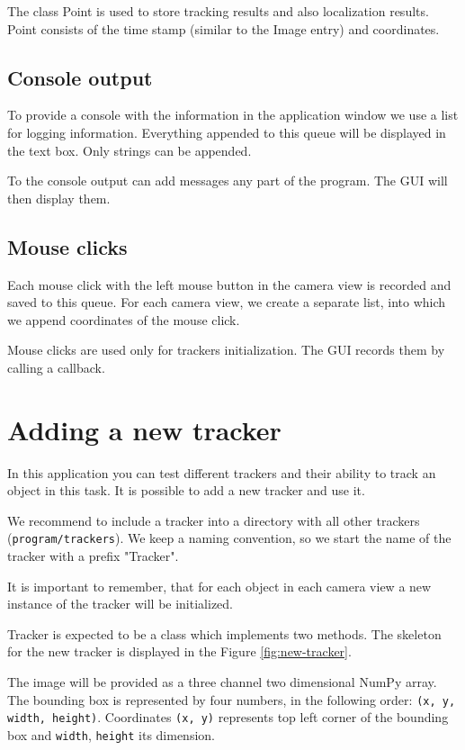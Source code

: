 The class Point is used to store tracking results and also localization
results. Point consists of the time stamp (similar to the Image entry) and
coordinates.

\subsection*{Console output}

To provide a console with the information in the application window we use a
list for logging information. Everything appended to this queue will be
displayed in the text box. Only strings can be appended.

To the console output can add messages any part of the program. The GUI will
then display them.

\subsection*{Mouse clicks}

Each mouse click with the left mouse button in the camera view is recorded and
saved to this queue. For each camera view, we create a separate list, into
which we append coordinates of the mouse click.

Mouse clicks are used only for trackers initialization. The GUI records them by
calling a callback.

\section{Adding a new tracker} 

In this application you can test different
trackers and their ability to track an object in this task. It is possible to
add a new tracker and use it.

We recommend to include a tracker into a directory with all other trackers
(\verb+program/trackers+). We keep a naming convention, so we start the name of
the tracker with a prefix "Tracker".

It is important to remember, that for each object in each camera view a new
instance of the tracker will be initialized.

Tracker is expected to be a class which implements two methods. The skeleton
for the new tracker is displayed in the Figure \ref{fig:new-tracker}.

The image will be provided as a three channel two dimensional NumPy array. The
bounding box is represented by four numbers, in the following order: \verb+(x, y, width, height)+.
Coordinates \verb+(x, y)+ represents top left corner of
the bounding box and \verb+width+, \verb+height+ its dimension.

